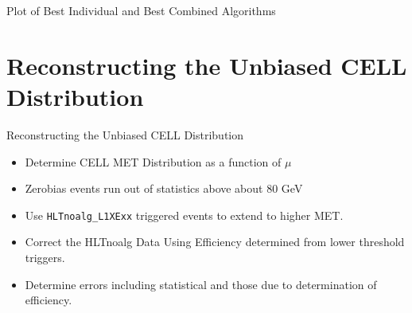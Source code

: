 \documentclass[]{beamer}
\begin{document}
\begin{frame}{Plot of Best Individual and Best Combined Algorithms}
\end{frame}
\section{Reconstructing the Unbiased CELL Distribution}
\begin{frame}{Reconstructing the Unbiased CELL Distribution}
\begin{itemize}
        \item Determine CELL MET Distribution as a function of $\mu$
        \item Zerobias events run out of statistics above about 80 GeV
        \item Use \texttt{HLTnoalg\_L1XExx} triggered events to extend to higher MET.
        \item Correct the HLTnoalg Data Using Efficiency determined from lower threshold triggers.
        \item Determine errors including statistical and those due to determination of efficiency.
\end{itemize}
\end{frame}
\end{document}
